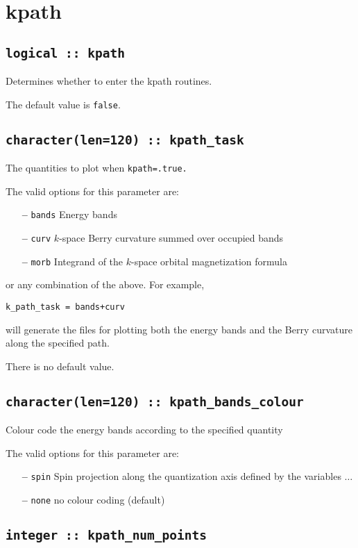 \clearpage
\section{kpath}

\subsection[berry]{\tt logical :: kpath}
Determines whether to enter the kpath routines.

The default value is \verb#false#.


\subsection[kpath\_task]{\tt character(len=120) ::  kpath\_task} 
The quantities to plot when {\tt kpath=.true.} 

The valid options for this parameter are:
\begin{itemize}
\item[{\bf --}]  \verb#bands# Energy bands
\item[{\bf --}] \verb#curv# $k$-space Berry curvature summed over
  occupied bands
\item[{\bf --}] \verb#morb#  Integrand of the $k$-space orbital
  magnetization formula
\end{itemize}

or any combination of the above. For example,

{\tt k\_path\_task = bands+curv}

will generate the files for plotting both the energy bands and the Berry curvature
along the specified path.

There is no default value.

\subsection[kpath\_colour]{\tt character(len=120) ::  kpath\_bands\_colour}
Colour code the energy bands according to the specified quantity

The valid options for this parameter are:
\begin{itemize}
\item[{\bf --}]  \verb#spin# Spin projection along the quantization axis
defined by the variables $\ldots$
\item[{\bf --}]  \verb#none# no colour coding (default)
\end{itemize}


\subsection[kpath\_num\_points]{\tt integer :: kpath\_num\_points}

